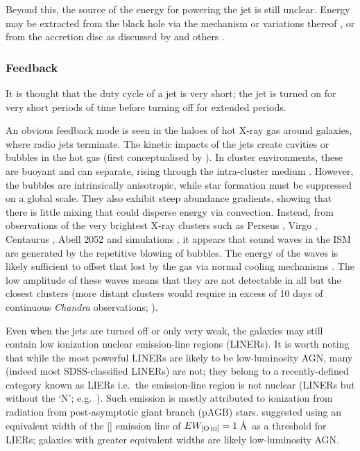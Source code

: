 			Beyond this, the source of the energy for powering the jet is still unclear. Energy may be extracted from the black hole via the \citet{Blandford1977} mechanism or variations thereof \citep[e.g.][]{Koide2002}, or from the accretion disc as discussed by \citet{Blandford1982} and others \citep[e.g.][]{Hujeirat2003}. 

		\subsubsection{Feedback}
			\label{subsubsec:JetFeedback}
			It is thought that the duty cycle of a jet is very short; the jet is turned on for very short periods of time before turning off for extended periods. 

			An obvious feedback mode is seen in the haloes of hot X-ray gas around galaxies, where radio jets terminate. The kinetic impacts of the jets create cavities or bubbles in the hot gas (first conceptualised by \citealt{Gull1973}). In cluster environments, these are buoyant and can separate, rising through the intra-cluster medium \citep[e.g.][]{Churazov2000, Churazov2001, McNamara2000}. However, the bubbles are intrinsically anisotropic, while star formation must be suppressed on a global scale. They also exhibit steep abundance gradients, showing that there is little mixing that could disperse energy via convection. Instead, from observations of the very brightest X-ray clusters such as Perseus \citep{Fabian2003, Fabian2006}, Virgo \citep{Forman2007}, Centaurus \citep{Sanders2008}, Abell 2052 \citep{Blanton2011} and simulations \citep[e.g.][]{Ruszkowski2004, Sijacki2006}, it appears that sound waves in the ISM are generated by the repetitive blowing of bubbles. The energy of the waves is likely sufficient to offset that lost by the gas via normal cooling mechanisms \citep{Fabian2003}. The low amplitude of these waves means that they are not detectable in all but the closest clusters (more distant clusters would require in excess of 10 days of continuous \textit{Chandra} observations; \citealt{Graham2008}).

			Even when the jets are turned off or only very weak, the galaxies may still contain low ionization nuclear emission-line regions (LINERs). It is worth noting that while the most powerful LINERs are likely to be low-luminosity AGN, many (indeed most SDSS-classified LINERs) are not; they belong to a recently-defined category known as LIERs i.e.\ the emission-line region is not nuclear (LINERs but without the `N'; e.g.\ \citealt{Sarzi2005, Sarzi2010, Singh2013, Belfiore2016a}). Such emission is mostly attributed to ionization from radiation from post-asymptotic giant branch (pAGB) stars. \citet{Capetti2011} suggested using an equivalent width of the [] emission line of $EW_\text{[\ion{O}{iii}]} = 1$\,\AA\ as a threshold for LIERs; galaxies with greater equivalent widths are likely low-luminosity AGN.

